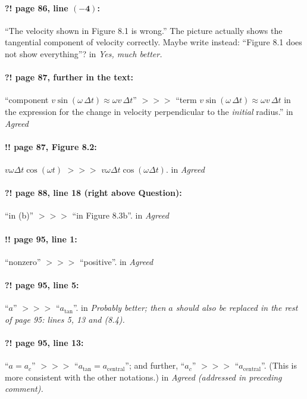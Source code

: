 \documentclass[twoside]{article}
\begin{document}
\paragraph{?! page 86, line $\bm{(-4)}$:} “The velocity shown in Figure 8.1 is wrong.” The picture actually shows the tangential component of velocity correctly. Maybe write instead: “Figure 8.1 does not show everything”?
 in {\it  Yes, much better. } 

\paragraph{?! page 87, further in the text:} “component $v \sin(\omega \,\Delta t) \approx \omega v \,\Delta t$” $>\!>\!>$ “term $v \sin(\omega \,\Delta t) \approx \omega v \,\Delta t$ in the expression for the change in velocity perpendicular to the \emph{initial} radius.”
 in {\it  Agreed} 

\paragraph{!! page 87, Figure 8.2:} $v\omega\Delta t\cos(\omega t)$ $>\!>\!>$ $v\omega\Delta t\cos(\omega \Delta t)$.
 in {\it  Agreed} 

\paragraph{?! page 88, line 18 (right above Question):} “in (b)” $>\!>\!>$ “in Figure 8.3b”.
 in {\it  Agreed} 

\paragraph{!! page 95, line 1:} “nonzero” $>\!>\!>$ “positive”.
 in {\it  Agreed} 

\paragraph{?! page 95, line 5:} “$a$” $>\!>\!>$ “$a_{\mathrm{tan}}$”.
 in {\it  Probably better;  then $a$  should also be replaced in the rest of page 95: lines 5, 13 and (8.4). } 

\paragraph{?! page 95, line 13:} “$a=a_c$” $>\!>\!>$ “$a_{\mathrm{tan}} = a_{\mathrm{central}}$”; and further,
“$a_c$” $>\!>\!>$ “$a_{\mathrm{central}}$”. (This is more consistent with the other notations.)
 in {\it  Agreed (addressed in preceding comment).  } 
\end{document}
